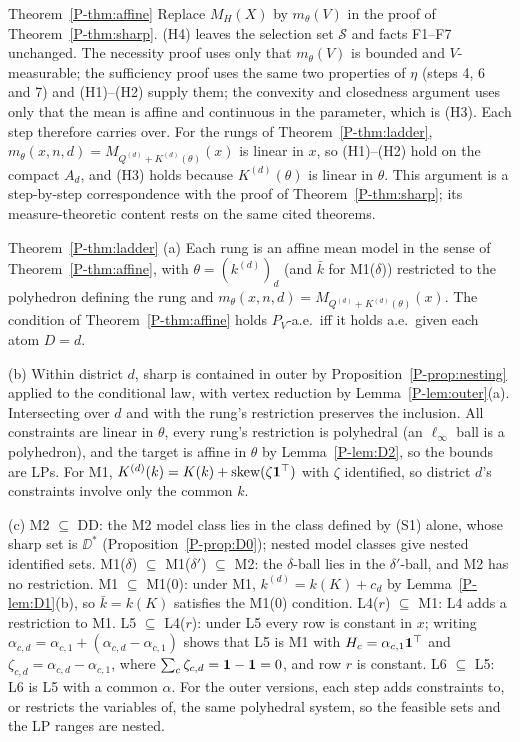 \begin{proofof}{Theorem~\ref{P-thm:affine}}
Replace $M_H(X)$ by $m_\theta(V)$ in the proof of Theorem~\ref{P-thm:sharp}. (H4) leaves
the selection set $\mathcal S$ and facts F1--F7 unchanged. The necessity proof uses
only that $m_\theta(V)$ is bounded and $V$-measurable; the sufficiency proof uses the
same two properties of $\eta$ (steps 4, 6 and 7) and (H1)--(H2) supply them; the
convexity and closedness argument uses only that the mean is affine and continuous in
the parameter, which is (H3). Each step therefore carries over. For the rungs of
Theorem~\ref{P-thm:ladder}, $m_\theta(x,n,d)=M_{Q^{(d)}+K^{(d)}(\theta)}(x)$ is linear in
$x$, so (H1)--(H2) hold on the compact $A_d$, and (H3) holds because $K^{(d)}(\theta)$ is
linear in $\theta$. This argument is a step-by-step correspondence with the proof of
Theorem~\ref{P-thm:sharp}; its measure-theoretic content rests on the same cited
theorems.
\end{proofof}

\begin{proofof}{Theorem~\ref{P-thm:ladder}}
(a) Each rung is an affine mean model in the sense of Theorem~\ref{P-thm:affine}, with
$\theta=(k^{(d)})_d$ (and $\bar k$ for M1($\delta$)) restricted to the polyhedron
defining the rung and $m_\theta(x,n,d)=M_{Q^{(d)}+K^{(d)}(\theta)}(x)$. The condition of
Theorem~\ref{P-thm:affine} holds $P_V$-a.e.\ iff it holds a.e.\ given each atom $D=d$.

(b) Within district $d$, sharp is contained in outer by Proposition~\ref{P-prop:nesting}
applied to the conditional law, with vertex reduction by Lemma~\ref{P-lem:outer}(a).
Intersecting over $d$ and with the rung's restriction preserves the inclusion. All
constraints are linear in $\theta$, every rung's restriction is polyhedral (an
$\ell_\infty$ ball is a polyhedron), and the target is affine in $\theta$ by
Lemma~\ref{P-lem:D2}, so the bounds are LPs. For M1,
$K^{(d)}(k)=K(k)+\operatorname{skew}(\zeta\mathbf 1^\top)$ with $\zeta$ identified, so district $d$'s
constraints involve only the common $k$.

(c) M2 $\subseteq$ DD: the M2 model class lies in the class defined by (S1) alone,
whose sharp set is $\DD^*$ (Proposition~\ref{P-prop:D0}); nested model classes give
nested identified sets. M1($\delta$) $\subseteq$ M1($\delta'$) $\subseteq$ M2: the
$\delta$-ball lies in the $\delta'$-ball, and M2 has no restriction. M1 $\subseteq$
M1(0): under M1, $k^{(d)}=k(K)+c_d$ by Lemma~\ref{P-lem:D1}(b), so $\bar k=k(K)$
satisfies the M1(0) condition. L4($r$) $\subseteq$ M1: L4 adds a restriction to M1.
L5 $\subseteq$ L4($r$): under L5 every row is constant in $x$; writing
$\alpha_{c,d}=\alpha_{c,1}+(\alpha_{c,d}-\alpha_{c,1})$ shows that L5 is M1 with
$H_c=\alpha_{c,1}\mathbf 1^\top$ and $\zeta_{c,d}=\alpha_{c,d}-\alpha_{c,1}$, where
$\sum_c\zeta_{c,d}=\mathbf 1-\mathbf 1=0$, and row $r$ is constant. L6 $\subseteq$ L5: L6 is L5 with
a common $\alpha$. For the outer versions, each step adds constraints to, or restricts
the variables of, the same polyhedral system, so the feasible sets and the LP ranges
are nested.
\end{proofof}

